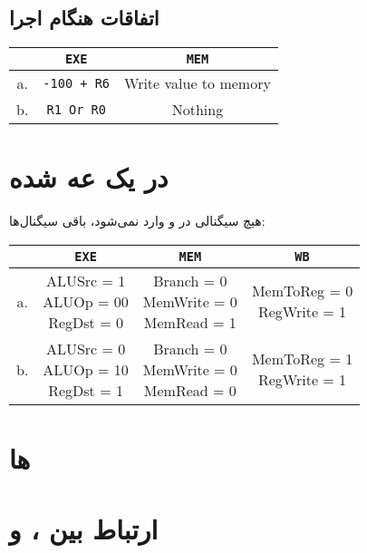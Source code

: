 \documentclass[11pt, dvipsnames, svgnames, x11names]{article}
\begin{document}
\subsection{اتفاقات هنگام اجرا}
\begin{latin}
\begin{table}[H]
\begin{center}
\begin{tabular}{|c|c|c|}
\hline
&
\texttt{EXE}&
\texttt{MEM}\\
\hline
\hline
a. &
\texttt{-100 + R6}&
Write value to memory \\
\hline
b. &
\texttt{R1 Or R0} &
Nothing \\
\hline
\end{tabular}
\end{center}
\end{table}
\end{latin}

\section{ در یک  عه  شده}
هیچ سیگنالی در 
و
وارد نمی‌شود، باقی سیگنال‌ها:
\begin{latin}
\begin{table}[H]
\begin{center}
\begin{tabular}{|c|c|c|c|}
\hline
&
\texttt{EXE} &
\texttt{MEM}&
\texttt{WB}
\\
\hline
\hline
a. &
\makecell[l]{
ALUSrc = 1 \\
ALUOp = 00 \\
RegDst = 0}&
\makecell[l]{
Branch = 0 \\
MemWrite = 0 \\
MemRead = 1}&
\makecell[l]{
MemToReg = 0 \\
RegWrite = 1}
\\
\hline
b. &
\makecell[l]{
ALUSrc = 0 \\
ALUOp = 10 \\
RegDst = 1}&
\makecell[l]{
Branch = 0 \\
MemWrite = 0 \\
MemRead = 0}&
\makecell[l]{
MemToReg = 1 \\
RegWrite = 1}
\\
\hline
\end{tabular}
\end{center}
\end{table}
\end{latin}
\section{ها}
\section{ارتباط بین ،  و }
\end{document}
